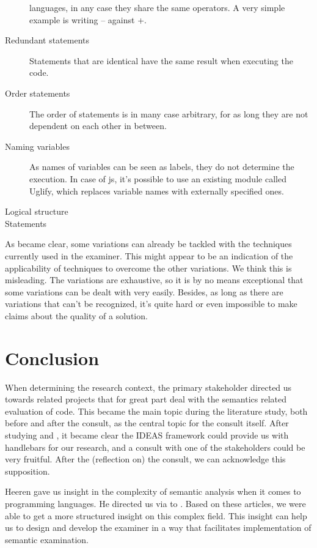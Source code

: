 \begin{description}
	languages, in any case they share the same operators. A very simple example is
	writing -- against +.
	\item[Redundant statements] Statements that are identical have the same result
	when executing the code.  
	\item[Order statements] The order of statements is in many case arbitrary, for
	as long they are not dependent on each other in between.
	\item[Naming variables] As names of variables can be seen as labels, they do
	not determine the execution. In case of \gls{js}, it's possible to use an
	existing module called Uglify, which replaces variable names with externally
	specified ones.
	\item[Logical structure] %
	\item[Statements]	%
\end{description}


As became clear, some variations can already be tackled with the techniques
currently used in the \gls{examiner}. This might appear to be an indication of 
the applicability of techniques to overcome the other variations. We think this 
is misleading. The variations are exhaustive, so it is by no means exceptional 
that some variations can be dealt with very easily. Besides, as long as there are
variations that can't be recognized, it's quite hard or even impossible to make
claims about the quality of a \gls{solution}. 
	
\section{Conclusion}
When determining the research context, the primary stakeholder directed us 
towards related projects that for great part deal with the semantics related
evaluation of \gls{code}. This became the main topic during the literature 
study, both before and after the consult, as the central topic for the consult
itself. After studying \citep{gerdes2012ask} and \citep{heeren2010specifying},
it became clear the IDEAS framework could provide us with handlebars for our
research, and a consult with one of the stakeholders could be very fruitful. 
After the (reflection on) the consult, we can acknowledge this supposition.


Heeren gave us insight in the complexity of semantic analysis when it comes to
programming languages. He directed us via \citep{keuning2014strategy} to 
\citep{xu2003transformation}. Based on these articles, we were able to get a
more structured insight on this complex field. This insight can help us to 
design and develop the \gls{examiner} in a way that facilitates implementation 
of semantic examination.


